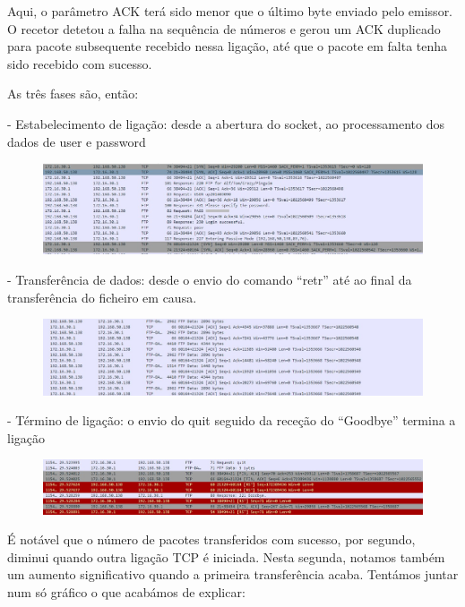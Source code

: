 \documentclass[a4paper]{article}
\begin{document}
Aqui, o parâmetro ACK terá sido menor que o último byte enviado pelo emissor. O recetor detetou a falha na sequência de números e gerou um ACK duplicado para pacote subsequente recebido nessa ligação, até que o pacote em falta tenha sido recebido com sucesso.

As três fases são, então:

- Estabelecimento de ligação: desde a abertura do socket, ao processamento dos dados de user e password 

\begin{figure}[!ht]
\centering
\includegraphics[scale=0.35]{connection_tcp.jpg}
\end{figure}

- Transferência de dados: desde o envio do comando “retr” até ao final da transferência do ficheiro em causa. 

\begin{figure}[!ht]
\centering
\includegraphics[scale=0.35]{trans_tcp.jpg}
\end{figure}

- Término de ligação: o envio do quit seguido da receção do “Goodbye” termina a ligação 

\begin{figure}[!ht]
\centering
\includegraphics[scale=0.35]{quit_tcp.jpg}
\end{figure}

É notável que o número de pacotes transferidos com sucesso, por segundo, diminui quando outra ligação TCP é iniciada. Nesta segunda, notamos também um aumento significativo quando a primeira transferência acaba. Tentámos juntar num só gráfico o que acabámos de explicar: 
\end{document}
